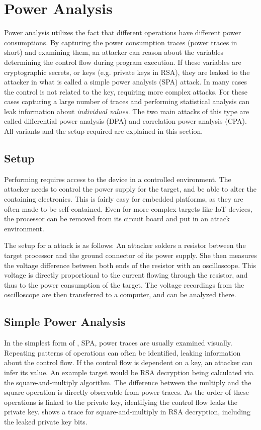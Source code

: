 \section{Power Analysis}
\label{poweranalysis}
Power analysis utilizes the fact that different operations have different power consumptions.
By capturing the power consumption traces (power traces in short) and examining them, an attacker can reason about the variables determining the control flow during program execution.
If these variables are cryptographic secrets, or keys (e.g. private keys in RSA), they are leaked to the attacker in what is called a simple power analysis (SPA) attack\cite{kocher1999differential}.
In many cases the control is not related to the key, requiring more complex attacks.
For these cases capturing a large number of traces and performing statistical analysis can leak information about \emph{individual values}.
The two main attacks of this type are called differential power analysis (DPA)\cite{kocher1999differential} and correlation power analysis (CPA)\cite{brier2004correlation}.
All variants and the setup required are explained in this section.

\subsection{Setup}
Performing \poweranalysis{} requires access to the device in a controlled environment.
The attacker needs to control the power supply for the target, and be able to alter the containing electronics.
This is fairly easy for embedded platforms, as they are often made to be self-contained.
Even for more complex targets like IoT devices, the processor can be removed from its circuit board and put in an attack environment\cite{ronen2017iot}.

The setup for a \poweranalysis{} attack is as follows:
An attacker solders a resistor between the target processor and the ground connector of its power supply.
She then measures the voltage difference between both ends of the resistor with an oscilloscope.
This voltage is directly proportional to the current flowing through the resistor, and thus to the power consumption of the target.
The voltage recordings from the oscilloscope are then transferred to a computer, and can be analyzed there.

\subsection{Simple Power Analysis}
In the simplest form of \poweranalysis{}, SPA, power traces are usually examined visually.
Repeating patterns of operations can often be identified, leaking information about the control flow.
If the control flow is dependent on a key, an attacker can infer its value.
An example target would be RSA decryption being calculated via the square-and-multiply algorithm.
The difference between the multiply and the square operation is directly observable from power traces.
As the order of these operations is linked to the private key, identifying the control flow leaks the private key.
 shows a trace for square-and-multiply in RSA decryption, including the leaked private key bits.

